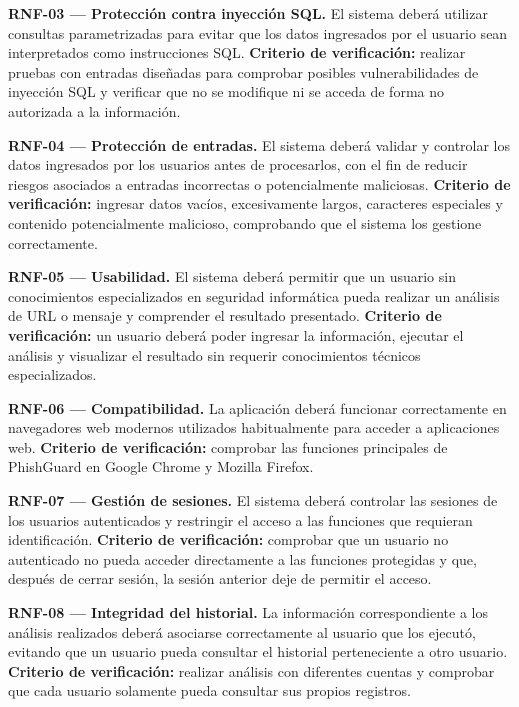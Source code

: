\documentclass[journal,onecolumn,12pt,draftclsnofoot]{IEEEtran}
\begin{document}
\par\medskip\noindent\textbf{RNF-03 --- Protección contra inyección SQL.} El sistema deberá utilizar consultas parametrizadas para evitar que los datos ingresados por el usuario sean interpretados como instrucciones SQL. \textbf{Criterio de verificación:} realizar pruebas con entradas diseñadas para comprobar posibles vulnerabilidades de inyección SQL y verificar que no se modifique ni se acceda de forma no autorizada a la información.

\par\medskip\noindent\textbf{RNF-04 --- Protección de entradas.} El sistema deberá validar y controlar los datos ingresados por los usuarios antes de procesarlos, con el fin de reducir riesgos asociados a entradas incorrectas o potencialmente maliciosas. \textbf{Criterio de verificación:} ingresar datos vacíos, excesivamente largos, caracteres especiales y contenido potencialmente malicioso, comprobando que el sistema los gestione correctamente.

\par\medskip\noindent\textbf{RNF-05 --- Usabilidad.} El sistema deberá permitir que un usuario sin conocimientos especializados en seguridad informática pueda realizar un análisis de URL o mensaje y comprender el resultado presentado. \textbf{Criterio de verificación:} un usuario deberá poder ingresar la información, ejecutar el análisis y visualizar el resultado sin requerir conocimientos técnicos especializados.

\par\medskip\noindent\textbf{RNF-06 --- Compatibilidad.} La aplicación deberá funcionar correctamente en navegadores web modernos utilizados habitualmente para acceder a aplicaciones web. \textbf{Criterio de verificación:} comprobar las funciones principales de PhishGuard en Google Chrome y Mozilla Firefox.

\par\medskip\noindent\textbf{RNF-07 --- Gestión de sesiones.} El sistema deberá controlar las sesiones de los usuarios autenticados y restringir el acceso a las funciones que requieran identificación. \textbf{Criterio de verificación:} comprobar que un usuario no autenticado no pueda acceder directamente a las funciones protegidas y que, después de cerrar sesión, la sesión anterior deje de permitir el acceso.

\par\medskip\noindent\textbf{RNF-08 --- Integridad del historial.} La información correspondiente a los análisis realizados deberá asociarse correctamente al usuario que los ejecutó, evitando que un usuario pueda consultar el historial perteneciente a otro usuario. \textbf{Criterio de verificación:} realizar análisis con diferentes cuentas y comprobar que cada usuario solamente pueda consultar sus propios registros.
\end{document}
